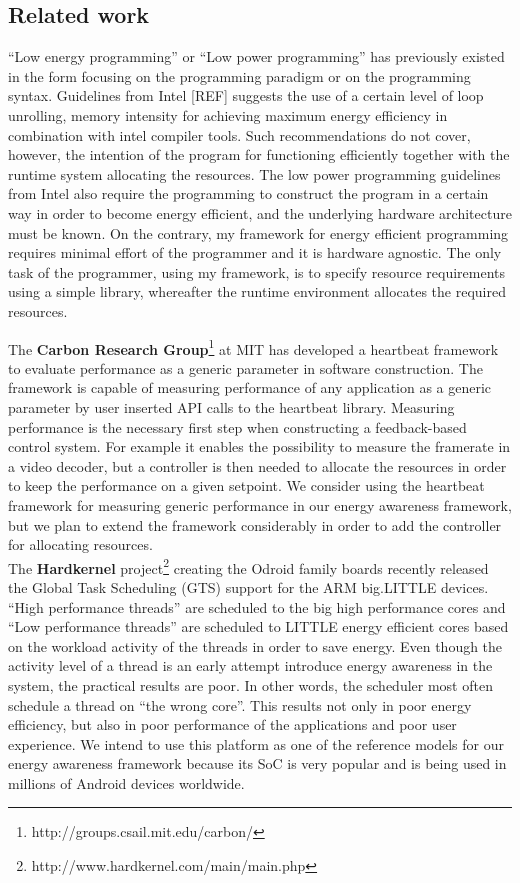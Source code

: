 \documentclass{article}
\begin{document}
\subsection{Related work}
``Low energy programming'' or ``Low power programming'' has previously existed in the form focusing on the programming paradigm or on the programming syntax. 
Guidelines from Intel [REF] suggests the use of a certain level of loop unrolling, memory intensity  for achieving maximum energy efficiency in combination with intel compiler tools. 
Such recommendations do not cover, however, the intention of the program for functioning efficiently together with the runtime system allocating the resources. 
The low power programming guidelines from Intel also require the programming to construct the program in a certain way in order to become energy efficient, 
and the underlying hardware architecture must be known. 
On the contrary, my framework for energy efficient programming requires minimal effort of the programmer and it is hardware agnostic. 
The only task of the programmer, using my framework, is to specify resource requirements using a simple library, whereafter the runtime environment allocates the required resources.

The \textbf{Carbon Research Group}\footnote{http://groups.csail.mit.edu/carbon/} at MIT has developed a heartbeat framework to evaluate performance as a generic parameter in software construction. The framework is capable of measuring performance of any application as a generic parameter by user inserted API calls to the heartbeat library. Measuring performance is the necessary first step when constructing a feedback-based control system. For example it enables the possibility to measure the framerate in a video decoder, but a controller is then needed to allocate the resources in order to keep the performance on a given setpoint. We consider using the heartbeat framework for measuring generic performance in our energy awareness framework, but we plan to extend the framework considerably in order to add the controller for allocating resources.\\

The \textbf{Hardkernel} project\footnote{http://www.hardkernel.com/main/main.php} creating the Odroid family boards recently released the Global Task Scheduling (GTS) support for the ARM big.LITTLE devices. “High performance threads” are scheduled to the big high performance cores and “Low performance threads” are scheduled to LITTLE energy efficient cores based on the workload activity of the threads in order to save energy. Even though the activity level of a thread is an early attempt introduce energy awareness in the system, the practical results are poor. In other words, the scheduler most often schedule a thread on “the wrong core”. This results not only in poor energy efficiency, but also in poor performance of the applications and poor user experience. We intend to use this platform as one of the reference models for our energy awareness framework because its SoC is very popular and is being used in millions of Android devices worldwide.\\
\end{document}
